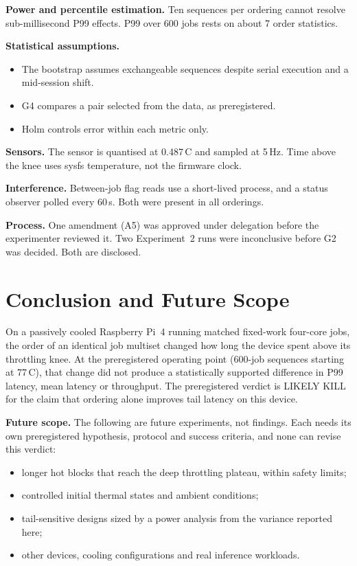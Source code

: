 \documentclass[conference,a4paper]{IEEEtran}
\newcommand{\degC}{\,\textdegree{}C}
\begin{document}
\textbf{Power and percentile estimation.} Ten sequences per ordering cannot resolve sub-millisecond P99 effects.
P99 over 600 jobs rests on about 7 order statistics.

\textbf{Statistical assumptions.}
\begin{itemize}
\item The bootstrap assumes exchangeable sequences despite serial execution and a mid-session shift.
\item G4 compares a pair selected from the data, as preregistered.
\item Holm controls error within each metric only.
\end{itemize}

\textbf{Sensors.} The sensor is quantised at 0.487\degC{} and sampled at 5\,Hz. Time above the knee uses sysfs
temperature, not the firmware clock.

\textbf{Interference.} Between-job flag reads use a short-lived process, and a status observer polled every
60\,s. Both were present in all orderings.

\textbf{Process.} One amendment (A5) was approved under delegation before the experimenter reviewed it. Two Experiment~2
runs were inconclusive before G2 was decided. Both are disclosed.

\section{Conclusion and Future Scope}
On a passively cooled Raspberry Pi~4 running matched fixed-work four-core jobs, the order of an identical job
multiset changed how long the device spent above its throttling knee. At the preregistered operating point
(600-job sequences starting at 77\degC{}), that change did not produce a statistically supported difference in P99
latency, mean latency or throughput. The preregistered verdict is LIKELY KILL for the claim that ordering alone
improves tail latency on this device.

\textbf{Future scope.} The following are future experiments, not findings. Each needs its own preregistered
hypothesis, protocol and success criteria, and none can revise this verdict:
\begin{itemize}
\item longer hot blocks that reach the deep throttling plateau, within safety limits;
\item controlled initial thermal states and ambient conditions;
\item tail-sensitive designs sized by a power analysis from the variance reported here;
\item other devices, cooling configurations and real inference workloads.
\end{itemize}
\end{document}
